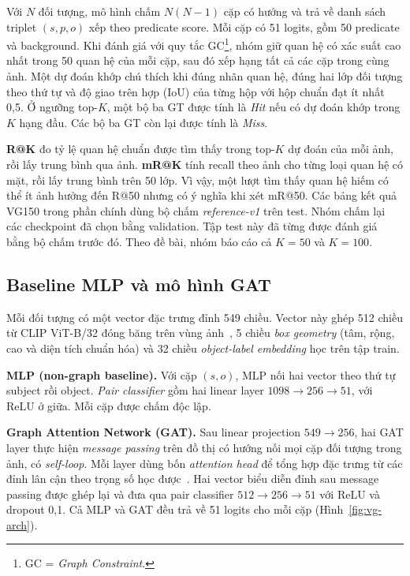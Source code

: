 Với $N$ đối tượng, mô hình chấm $N(N-1)$ cặp có hướng và trả về danh sách
triplet $(s,p,o)$ xếp theo predicate score. Mỗi cặp có 51 logits, gồm
50 predicate và background. Khi đánh giá với
quy tắc GC\footnote{GC = \textit{Graph Constraint}.}, nhóm giữ quan hệ có xác suất cao nhất trong
50 quan hệ của mỗi cặp, sau đó xếp hạng tất cả các cặp trong cùng ảnh.
Một dự đoán khớp chú thích khi đúng nhãn quan hệ, đúng hai lớp đối tượng theo
thứ tự và độ giao trên hợp (IoU) của từng hộp với hộp chuẩn đạt ít nhất 0,5.
Ở ngưỡng top-$K$, một bộ ba GT được tính là \textit{Hit} nếu có dự đoán khớp
trong $K$ hạng đầu. Các bộ ba GT còn lại được tính là \textit{Miss}.

\textbf{R@K} đo tỷ lệ quan hệ chuẩn được tìm thấy trong top-$K$ dự đoán
của mỗi ảnh, rồi lấy trung bình qua ảnh. \textbf{mR@K} tính recall theo ảnh
cho từng loại quan hệ có mặt, rồi lấy trung bình trên 50 lớp. Vì vậy, một
lượt tìm thấy quan hệ hiếm có thể ít ảnh hưởng đến R@50 nhưng có ý nghĩa khi
xét mR@50. Các bảng kết quả VG150 trong phần chính dùng bộ chấm \textit{reference-v1}
trên test. Nhóm chấm lại các checkpoint đã chọn bằng validation. Tập test
này đã từng được đánh giá bằng bộ chấm trước đó. Theo đề bài, nhóm báo cáo cả $K=50$ và $K=100$.

\subsection{Baseline MLP và mô hình GAT}
Mỗi đối tượng có một vector đặc trưng đỉnh 549 chiều. Vector này ghép
512 chiều từ CLIP ViT-B/32 đóng băng trên vùng ảnh~\cite{radford2021clip},
5 chiều \textit{box geometry} (tâm, rộng, cao và diện tích chuẩn hóa)
và 32 chiều \textit{object-label embedding} học trên tập train.

\textbf{MLP (non-graph baseline).} Với cặp $(s,o)$, MLP nối hai vector theo
thứ tự subject rồi object. \textit{Pair classifier} gồm hai linear layer
$1098\to256\to51$, với ReLU ở giữa. Mỗi cặp được chấm độc lập.

\textbf{Graph Attention Network (GAT).} Sau linear projection $549\to256$,
hai GAT layer thực hiện \textit{message passing} trên đồ thị có hướng nối
mọi cặp đối tượng trong ảnh, có \textit{self-loop}. Mỗi layer dùng bốn
\textit{attention head} để tổng hợp đặc trưng từ các đỉnh lân cận
theo trọng số học được~\cite{velickovic2018gat}. Hai vector biểu diễn đỉnh sau
message passing được ghép lại và đưa qua pair classifier $512\to256\to51$
với ReLU và dropout 0,1. Cả MLP và GAT đều trả về 51 logits cho mỗi cặp (Hình~\ref{fig:vg-arch}).

